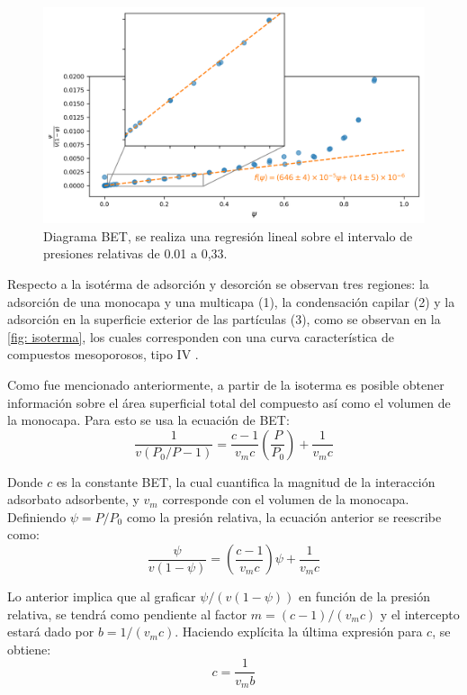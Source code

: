 \documentclass[fleqn,11pt]{SelfArx}
\begin{document}
	\begin{figure}[h]
		\centering
		\includegraphics[width=\linewidth]{BET}
		\caption{Diagrama BET, se realiza una regresi\'on lineal sobre el intervalo de presiones relativas de 0.01 a 0,33.}
		\label{fig: bet}
	\end{figure}
	\pagebreak
	
	Respecto a la isot\'erma de adsorci\'on y desorci\'on se observan tres regiones: la adsorci\'on de una monocapa y una multicapa (1), la condensaci\'on capilar (2) y la adsorci\'on en la superficie exterior de las part\'iculas (3), como se observan en la \autoref{fig: isoterma}, los cuales corresponden con una curva caracter\'istica de compuestos mesoporosos, tipo IV \cite{vargas_legnoverde_giraldo_basaldella_moreno-pirajan_2010}.
	
	Como fue mencionado anteriormente, a partir de la isoterma es posible obtener informaci\'on sobre el \'area superficial total del compuesto as\'i como el volumen de la monocapa. Para esto se usa la ecuaci\'on de BET:
	\begin{equation}
		\dfrac{1}{v(P_0/P - 1)} = \dfrac{c-1}{v_mc}\left(\dfrac{P}{P_0}\right) + \dfrac{1}{v_mc}
	\end{equation}
	
	Donde $c$ es la constante BET, la cual cuantifica la magnitud de la interacci\'on adsorbato adsorbente, y $v_m$ corresponde con el volumen de la monocapa. Definiendo $\psi = P/P_0$ como la presi\'on relativa, la ecuaci\'on anterior se reescribe como:
	\begin{equation}
		\dfrac{\psi}{v(1-\psi)} = \left(\dfrac{c-1}{v_mc}\right)\psi + \dfrac{1}{v_mc}
	\end{equation}
	\pagebreak
	
	Lo anterior implica que al graficar $\psi/(v(1-\psi))$ en funci\'on de la presi\'on relativa, se tendr\'a como pendiente al factor $m = (c-1)/(v_mc)$ y el intercepto estar\'a dado por $b = 1/(v_mc)$. Haciendo expl\'icita la \'ultima expresi\'on para $c$, se obtiene:
	\begin{equation}
		c = \dfrac{1}{v_mb}
	\end{equation}
	
\end{document}
